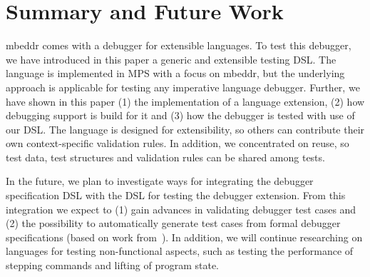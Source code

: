 \section{Summary and Future Work}

mbeddr comes with a debugger for extensible languages.
To test this debugger, we have introduced in this paper a generic and extensible
testing \ac{DSL}.
The language is implemented in \ac{MPS} with a focus on mbeddr, but the
underlying approach is applicable for testing any imperative language debugger. Further, we
have shown in this paper (1) the implementation of a language extension, (2) how
debugging support is build for it and (3) how the debugger is tested with use of
our \ac{DSL}. The language is designed for extensibility, so others can contribute
their own context-specific validation rules. In addition, we concentrated on
reuse, so test data, test structures and validation rules can be shared among
tests.

In the future, we plan to investigate ways for integrating the debugger
specification \ac{DSL} with the \ac{DSL} for testing the debugger extension. From this
integration we expect to (1) gain advances in validating debugger test cases and
(2) the possibility to automatically generate test cases from formal debugger
specifications (based on work
from~\cite{conf/kbse/WuG05,henriques05,journals/spe/WuGM08}).
In addition, we will continue
researching on languages for testing non-functional aspects, such as testing the
performance of stepping commands and lifting of program state.